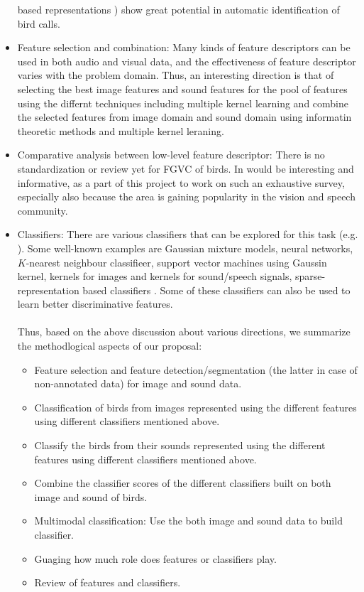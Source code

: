 \documentclass{article}
\begin{document}
\begin{itemize}
based representations \cite{padmanAllPoleGDelay, hegdeModgdf}) show great potential in
automatic identification of bird calls.
\item Feature selection and combination: Many kinds of feature descriptors can be used in both audio and visual data, and the effectiveness of feature descriptor varies with the problem domain. Thus, an interesting direction is that of selecting the best image features and sound features for the pool of features using the differnt techniques including multiple kernel learning and combine the selected features from image domain and sound domain using informatin theoretic methods and multiple kernel leraning. 
\item Comparative analysis between low-level feature descriptor: There is no standardization or review yet for FGVC of birds. In would be interesting and informative, as a part of this project to work on such an exhaustive survey, especially also because the area is gaining popularity in the vision and speech community.
\item Classifiers: There are various classifiers that can be explored for this task (e.g. \cite{duda}). Some well-known examples are Gaussian mixture models, neural networks, $K$-nearest neighbour classifieer, support vector machines using Gaussin kernel, kernels for images and kernels for sound/speech signals, sparse-representation based classifiers \cite{sparse,sparse1}. Some of these classifiers can also be used to learn better discriminative features. \ \\ \ \\
Thus, based on the above discussion about various directions, we summarize the methodlogical aspects of our proposal: 
\begin{itemize}
		\item Feature selection and feature detection/segmentation (the latter in case of non-annotated data) for image and sound data. 
    \item Classification of birds from images represented using the different features using different classifiers mentioned above.  
    \item Classify the birds from their sounds represented using the different features using different classifiers mentioned above. 
    \item Combine the classifier scores of the different classifiers built on both image and sound of birds.
    \item Multimodal classification: Use the both image and sound data to build classifier.
    \item Guaging how much role does features or classifiers play.
    \item Review of features and classifiers.
\end{itemize}
\end{itemize}
\end{document}
